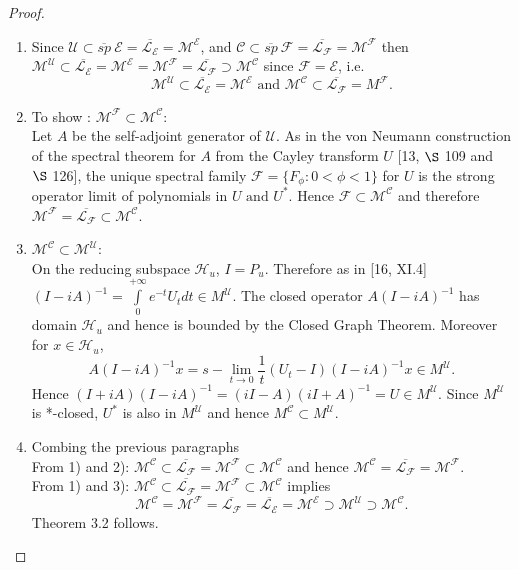\documentclass[req no]{amsart}[16pt]
\theoremstyle{plain}
\theoremstyle{definition}
\numberwithin{equation}{section}\setcounter{page}{1}
\def\m{\mbox}
\def\ma{\m{ and }}
\def\h{\mathcal{H}}
\def\E {\mathcal{E}}
\def\L {\mathcal{L}}
\def\M {\mathcal{M}}
\def\F {\mathcal{F}}
\def\C{\mathcal{C}}
\def\U{\mathcal{U}}
\begin{document}
\begin{proof}\

\begin{enumerate}

\item [1)]Since $ \U \subset \overline{sp}~\E = \overline{\L_{\E}}= \M^{\E}$, and $ \C \subset \overline{sp}~\F = \overline{\L_{\F}}= \M^{\F}$ then $\M^{\U} \subset \overline{\L _{\E }} = \M^{\E} = \M^{\mathcal{F}} = \overline{\L_{\F}} \supset \M^{\C}$  since $ \mathcal{F} = \mathcal{E}$, i.e. $$\M^{\U} \subset \overline{\L _{\E }} = \M^{\E}\ma \M^{\C}\subset \overline{\L_{\F}} =  M^\mathcal{F}. $$
\item [2)] To show : $\M^\mathcal{F}\subset \M^\mathcal{C}$:\\
Let $A$ be the self-adjoint generator of $\U$. As in the von Neumann construction of the spectral theorem for $A$ from the Cayley transform $U$ [13, $\S$ 109 and $\S$ 126], the unique spectral family $\mathcal{F}=\{F_\phi:0<\phi<1\}$ for $U$ is the strong operator limit of polynomials in $U \ma U^{*}$.  Hence $ \mathcal{F} \subset \M^\mathcal{C} $ and therefore $\M^\mathcal{F} = \overline{\L_{\F}}\subset\M^\mathcal{C}$.

\item [3)] $\M^\mathcal{C} \subset \M^\mathcal{U}$:\\
On the reducing subspace $\h_{u}$, $I = P_{u}$. Therefore as in [16, XI.4]  $(I - iA)^{-1} =\int\limits^{+\infty}_{0}e^{-t}U_t dt \in M^\mathcal{U}$. The closed operator $A( I - iA) ^{-1}$ has domain $\h_{u}$ and hence is bounded by the Closed Graph Theorem. Moreover for $x \in \h_{u}$,
\begin{equation}\label{eqn5}
 A(I - iA)^{-1}x = s-\lim\limits_{t \to 0}\frac{1}{t}( U_t - I)( I - iA)^{-1} x \in M^\mathcal{U}.
\end{equation}
Hence $(I+iA)( I - iA)^{-1}= (iI - A)(iI + A)^{-1} = U \in  M^\mathcal{U}$. Since $M^\mathcal{U}$ is *-closed, $U^*$ is also in $M^\mathcal{U}$ and hence $M^\mathcal{C} \subset M^\mathcal{U}$.

\item [4)]Combing the previous paragraphs\\
From 1) and 2): $\M^\mathcal{C} \subset \overline{\L_{\F}} = \M^\mathcal{F}\subset \M^\mathcal{C}$ and hence $\M^\mathcal{C} = \overline{\L_{\F}} = \M^\mathcal{F}$.\\
From 1) and 3): $\M^\mathcal{C} \subset \overline{\L_{\F}} = \M^\mathcal{F} \subset \M^\mathcal{C}$ implies
$$\M^\mathcal{C}=\M^\mathcal{F}=\overline{\L_{\F}} = \overline{\L_{\E}}= \M^\mathcal{E}\supset \M^\mathcal{U} \supset \M^\mathcal{C}.$$ Theorem 3.2  follows.
\end{enumerate}
\end{proof}
\end{document}
